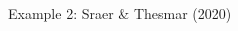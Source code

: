 \documentclass[notes,11pt, aspectratio=169]{beamer}
\begin{document}
\begin{frame}{Example 2: Sraer \& Thesmar (2020)}
\begin{columns}[T]
\begin{column}{.5\textwidth}
\begin{center}
{        }
    \end{center}
  \end{column}
\end{columns}

\end{frame}
\end{document}

